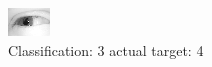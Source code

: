\begin{figure}[h!]
\begin{center}
\includegraphics[width=0.60\columnwidth]{figures/ID2423_class_3_target_4.png}
\end{center}
\caption{ Classification: 3 actual target: 4}
\label{fig:ID2423_class_3_target_4}
\end{figure}
